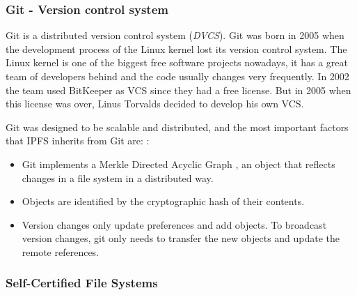 \subsubsection{Git - Version control system}
Git is a distributed version control system (\emph{DVCS})\cite{torvalds2010git}.
Git was born in 2005 when the development process of the Linux kernel lost its
version control system. The Linux kernel is one of the biggest free software
projects nowadays, it has a great team of developers behind and the code usually
changes very frequently. In 2002 the team used BitKeeper as VCS since they had a
free license. But in 2005 when this license was over, Linus Torvalds decided to
develop his own VCS\cite{spinellis2005version}.

Git was designed to be scalable and distributed, and the most important factors
that IPFS inherits from Git are: \cite{benet2014ipfs}:

\begin{itemize}
\item Git implements a Merkle Directed Acyclic Graph
  \cite{bleichenbacher1994directed}, an object that reflects changes in a file
  system in a distributed way.
\item Objects are identified by the cryptographic hash of their contents.
\item Version changes only update preferences and add objects. To broadcast
  version changes, git only needs to transfer the new objects and update the
  remote references.
\end{itemize}

\subsubsection{Self-Certified File Systems}





